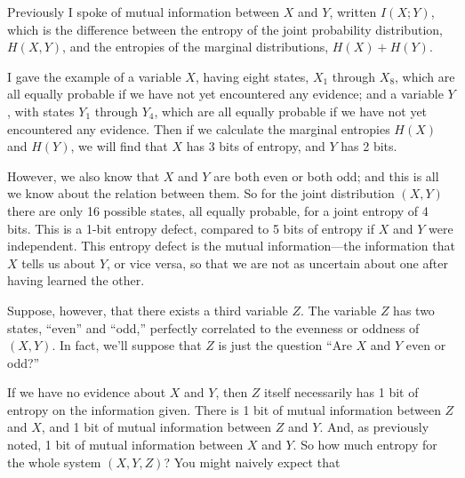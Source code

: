 {\myendsectiontext


\bigskip



 Previously I spoke of mutual information between $X$ and $Y$, written
$I(X;Y)$, which is the difference between the entropy of the joint
probability distribution, $H(X,Y)$, and the entropies of the marginal
distributions, $H(X) + H(Y)$. 


 I gave the example of a variable $X$, having eight states,
$X_{1}$ through $X_{8}$, which are all equally
probable if we have not yet encountered any evidence; and a variable $Y$,
with states $Y_{1}$ through $Y_{4}$, which are
all equally probable if we have not yet encountered any evidence. Then
if we calculate the marginal entropies $H(X)$ and $H(Y)$, we will find that
$X$ has 3 bits of entropy, and $Y$ has 2 bits.


 However, we also know that $X$ and $Y$ are both even or both odd; and
this is all we know about the relation between them. So for the joint
distribution $(X,Y)$ there are only 16 possible states, all equally
probable, for a joint entropy of 4 bits. This is a 1-bit entropy
defect, compared to 5 bits of entropy if $X$ and $Y$ were independent. This
entropy defect is the mutual information---the information that $X$ tells
us about $Y$, or vice versa, so that we are not as uncertain about one
after having learned the other.


 Suppose, however, that there exists a third variable $Z$. The
variable $Z$ has two states, ``even''
and ``odd,'' perfectly correlated to
the evenness or oddness of $(X,Y)$. In fact, we'll
suppose that $Z$ is just the question ``Are $X$ and $Y$ even
or odd?''


 If we have no evidence about $X$ and $Y$, then $Z$ itself necessarily
has 1 bit of entropy on the information given. There is 1 bit of mutual
information between $Z$ and $X$, and 1 bit of mutual information between $Z$
and $Y$. And, as previously noted, 1 bit of mutual information between $X$
and $Y$. So how much entropy for the whole system $(X,Y,Z)$? You might
naively expect that



}
